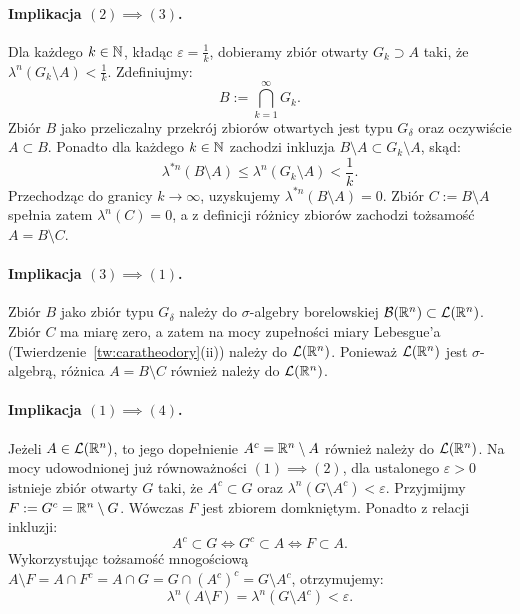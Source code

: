 \begin{dow}
    \paragraph{Implikacja $(2) \implies (3)$.}
    Dla każdego $k \in \mathbb{N}$, kładąc $\varepsilon = \frac{1}{k}$, dobieramy zbiór otwarty $G_k \supset A$ taki, że $\lambda^n(G_k \setminus A) < \frac{1}{k}$.
    Zdefiniujmy:
    \begin{equation*}
        B := \bigcap_{k=1}^\infty G_k.
    \end{equation*}
    Zbiór $B$ jako przeliczalny przekrój zbiorów otwartych jest typu $G_\delta$ oraz oczywiście $A \subset B$. Ponadto dla każdego $k \in \mathbb{N}$ zachodzi inkluzja $B \setminus A \subset G_k \setminus A$, skąd:
    \begin{equation*}
        \lambda^{*n}(B \setminus A) \le \lambda^n(G_k \setminus A) < \frac{1}{k}.
    \end{equation*}
    Przechodząc do granicy $k \to \infty$, uzyskujemy $\lambda^{*n}(B \setminus A) = 0$. Zbiór $C := B \setminus A$ spełnia zatem $\lambda^n(C) = 0$, a z definicji różnicy zbiorów zachodzi tożsamość $A = B \setminus C$.

    \paragraph{Implikacja $(3) \implies (1)$.}
    Zbiór $B$ jako zbiór typu $G_\delta$ należy do $\sigma$-algebry borelowskiej $\mathcal{B}({\mathbb{R}^{n}}) \subset \mathcal{L}({\mathbb{R}^{n}})$. Zbiór $C$ ma miarę zero, a zatem na mocy zupełności miary Lebesgue'a (Twierdzenie~\ref{tw:caratheodory}(ii)) należy do $\mathcal{L}({\mathbb{R}^{n}})$. Ponieważ $\mathcal{L}({\mathbb{R}^{n}})$ jest $\sigma$-algebrą, różnica $A = B \setminus C$ również należy do $\mathcal{L}({\mathbb{R}^{n}})$.

    \paragraph{Implikacja $(1) \implies (4)$.}
    Jeżeli $A \in \mathcal{L}({\mathbb{R}^{n}})$, to jego dopełnienie $A^c = \mathbb{R}^{n} \setminus A$ również należy do $\mathcal{L}({\mathbb{R}^{n}})$. Na mocy udowodnionej już równoważności $(1) \implies (2)$, dla ustalonego $\varepsilon > 0$ istnieje zbiór otwarty $G$ taki, że $A^c \subset G$ oraz $\lambda^n(G \setminus A^c) < \varepsilon$.
    Przyjmijmy $F := G^c = \mathbb{R}^{n} \setminus G$. Wówczas $F$ jest zbiorem domkniętym. Ponadto z relacji inkluzji:
    \begin{equation*}
        A^c \subset G \iff G^c \subset A \iff F \subset A.
    \end{equation*}
    Wykorzystując tożsamość mnogościową $A \setminus F = A \cap F^c = A \cap G = G \cap (A^c)^c = G \setminus A^c$, otrzymujemy:
    \begin{equation*}
        \lambda^n(A \setminus F) = \lambda^n(G \setminus A^c) < \varepsilon.
    \end{equation*}


\end{dow}
